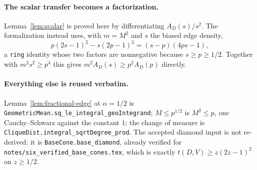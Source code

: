 \documentclass[11pt]{article}
\begin{document}
\paragraph{The scalar transfer becomes a factorization.}
Lemma~\ref{lem:scalar} is proved here by differentiating $A_D(s)/s^{2}$.  The
formalization instead uses, with $m=M^2$ and $s$ the biased edge density,
\begin{equation}
 p(2s-1)^2-s(2p-1)^2=(s-p)(4ps-1),
 \label{eq:lean-diamond-rescale}
\end{equation}
a \texttt{ring} identity whose two factors are nonnegative because
$s\geq p\geq1/2$.  Together with $m^2s^2\geq p^4$ this gives
$m^2A_D(s)\geq p^2A_D(p)$ directly.

\paragraph{Everything else is reused verbatim.}
Lemma~\ref{lem:fractional-edge} at $\alpha=1/2$ is
\texttt{GeometricMean.sq\_le\_integral\_geoIntegrand}; $M\leq p^{1/2}$ is
$M^2\leq p$, one Cauchy--Schwarz against the constant $1$; the change of measure
is \texttt{CliqueDist.integral\_sqrtDegree\_prod}.  The accepted diamond input
is not re-derived: it is \texttt{BaseCone.base\_diamond}, already verified for
\texttt{notes/six\_verified\_base\_cones.tex}, which is exactly
$t(D,V)\geq z(2z-1)^2$ on $z\geq1/2$.
\end{document}
